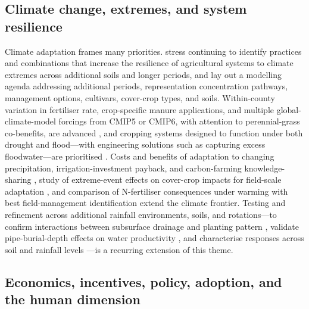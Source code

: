 \subsection{Climate change, extremes, and system resilience}

Climate adaptation frames many priorities. \textcite{Saha2024} stress continuing to identify practices and combinations that increase the resilience of agricultural systems to climate extremes across additional soils and longer periods, and \textcite{Malone2020} lay out a modelling agenda addressing additional periods, representation concentration pathways, management options, cultivars, cover-crop types, and soils. Within-county variation in fertiliser rate, crop-specific manure applications, and multiple global-climate-model forcings from CMIP5 or CMIP6, with attention to perennial-grass co-benefits, are advanced \parencite{Ferin2023}, and cropping systems designed to function under both drought and flood---with engineering solutions such as capturing excess floodwater---are prioritised \parencite{Dietzel2016}. Costs and benefits of adaptation to changing precipitation, irrigation-investment payback, and carbon-farming knowledge-sharing \parencite{PeltonenSainio2021}, study of extreme-event effects on cover-crop impacts for field-scale adaptation \parencite{Gupta2023b}, and comparison of N-fertiliser consequences under warming with best field-management identification \parencite{Haghnazari2020} extend the climate frontier. Testing and refinement across additional rainfall environments, soils, and rotations---to confirm interactions between subsurface drainage and planting pattern \parencite{Takeshima2023}, validate pipe-burial-depth effects on water productivity \parencite{Liu2025}, and characterise responses across soil and rainfall levels \parencite{Grewal2025,Negm2014,BENOIT1967}---is a recurring extension of this theme.

\subsection{Economics, incentives, policy, adoption, and the human dimension}

